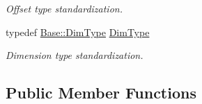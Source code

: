 \begin{DoxyCompactItemize}
\begin{DoxyCompactList}\small\item\em Offset type standardization. \end{DoxyCompactList}\item 
typedef \hyperlink{classffnn_1_1layer_1_1internal_1_1_interface_a8d121d0103f254b51e48f7b20a17681f}{Base\-::\-Dim\-Type} \hyperlink{classffnn_1_1layer_1_1_layer_a104a0f51427df4e03f4ac9e1ce7f6083}{Dim\-Type}
\begin{DoxyCompactList}\small\item\em Dimension type standardization. \end{DoxyCompactList}\end{DoxyCompactItemize}
\subsection*{Public Member Functions}
